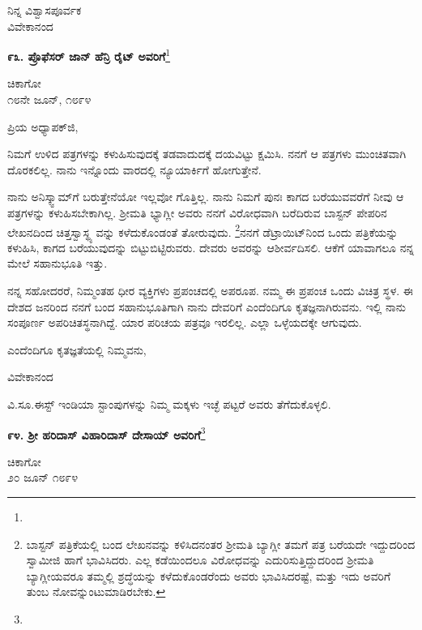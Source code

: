 {\flushright
ನಿನ್ನ ವಿಶ್ವಾಸಪೂರ್ವಕ\\ವಿವೇಕಾನಂದ\par}

\begin{center}
\textbf{೯೩. ಪ್ರೊಫೆಸರ್ ಜಾನ್ ಹೆನ್ರಿ ರೈಟ್ ಅವರಿಗೆ}\footnote{}
\end{center}

\begin{flushright}
ಚಿಕಾಗೋ\\೧೮ನೇ ಜೂನ್, ೧೮೯೪
\end{flushright}

\noindent
ಪ್ರಿಯ ಅಧ್ಯಾಪಕ್‌ಜಿ,

ನಿಮಗೆ ಉಳಿದ ಪತ್ರಗಳನ್ನು ಕಳುಹಿಸುವುದಕ್ಕೆ ತಡವಾದುದಕ್ಕೆ ದಯವಿಟ್ಟು ಕ್ಷಮಿಸಿ. ನನಗೆ ಆ ಪತ್ರಗಳು ಮುಂಚಿತವಾಗಿ ದೊರಕಲಿಲ್ಲ. ನಾನು ಇನ್ನೊಂದು ವಾರದಲ್ಲಿ ನ್ಯೂಯಾರ್ಕಿಗೆ ಹೋಗುತ್ತೇನೆ.

ನಾನು ಅನಿಸ್ಕ್ವಾಮ್‌ಗೆ ಬರುತ್ತೇನೆಯೋ ಇಲ್ಲವೋ ಗೊತ್ತಿಲ್ಲ. ನಾನು ನಿಮಗೆ ಪುನಃ ಕಾಗದ ಬರೆಯುವವರೆಗೆ ನೀವು ಆ ಪತ್ರಗಳನ್ನು ಕಳುಹಿಸಬೇಕಾಗಿಲ್ಲ. ಶ‍್ರೀಮತಿ ಭ್ಯಾಗ್ಲೀ ಅವರು ನನಗೆ ವಿರೋಧವಾಗಿ ಬರೆದಿರುವ ಬಾಸ್ಟನ್ ಪೇಪರಿನ ಲೇಖನದಿಂದ ಚಿತ್ತಸ್ವಾಸ್ಥ್ಯ ವನ್ನು ಕಳೆದುಕೊಂಡಂತೆ ತೋರುವುದು. \footnote{ಬಾಸ್ಟನ್ ಪತ್ರಿಕೆಯಲ್ಲಿ ಬಂದ ಲೇಖನವನ್ನು ಕಳಿಸಿದನಂತರ ಶ‍್ರೀಮತಿ ಬ್ಯಾಗ್ಲೀ ತಮಗೆ ಪತ್ರ ಬರೆಯದೇ ಇದ್ದುದರಿಂದ ಸ್ವಾಮೀಜಿ ಹಾಗೆ ಭಾವಿಸಿದರು. ಎಲ್ಲ ಕಡೆಯಿಂದಲೂ ವಿರೋಧವನ್ನು ಎದುರಿಸುತ್ತಿದ್ದುದರಿಂದ ಶ‍್ರೀಮತಿ ಬ್ಯಾಗ್ಲೀಯವರೂ ತಮ್ಮಲ್ಲಿ ಶ್ರದ್ಧೆಯನ್ನು ಕಳೆದುಕೊಂಡರೆಂದು ಅವರು ಭಾವಿಸಿದರಷ್ಟೆ, ಮತ್ತು ಇದು ಅವರಿಗೆ ತುಂಬ ನೋವನ್ನುಂಟುಮಾಡಿರಬೇಕು.}ನನಗೆ ಡೆಟ್ರಾಯಿಟ್‌ನಿಂದ ಒಂದು ಪತ್ರಿಕೆಯನ್ನು ಕಳುಹಿಸಿ, ಕಾಗದ ಬರೆಯುವುದನ್ನು ಬಿಟ್ಟುಬಿಟ್ಟಿರುವರು. ದೇವರು ಅವರನ್ನು ಆಶೀರ್ವದಿಸಲಿ. ಆಕೆಗೆ ಯಾವಾಗಲೂ ನನ್ನ ಮೇಲೆ ಸಹಾನುಭೂತಿ ಇತ್ತು.

ನನ್ನ ಸಹೋದರರೆ, ನಿಮ್ಮಂತಹ ಧೀರ ವ್ಯಕ್ತಿಗಳು ಪ್ರಪಂಚದಲ್ಲಿ ಅಪರೂಪ. ನಮ್ಮ ಈ ಪ್ರಪಂಚ ಒಂದು ವಿಚಿತ್ರ ಸ್ಥಳ. ಈ ದೇಶದ ಜನರಿಂದ ನನಗೆ ಬಂದ ಸಹಾನುಭೂತಿಗಾಗಿ ನಾನು ದೇವರಿಗೆ ಎಂದೆಂದಿಗೂ ಕೃತಜ್ಞನಾಗಿರುವನು. ಇಲ್ಲಿ ನಾನು ಸಂಪೂರ್ಣ ಅಪರಿಚಿತಸ್ಥನಾಗಿದ್ದೆ. ಯಾರ ಪರಿಚಯ ಪತ್ರವೂ ಇರಲಿಲ್ಲ. ಎಲ್ಲಾ ಒಳ್ಳೆಯದಕ್ಕೇ ಆಗುವುದು.

ಎಂದೆಂದಿಗೂ ಕೃತಜ್ಞತೆಯಲ್ಲಿ ನಿಮ್ಮವನು,

\begin{flushright}
ವಿವೇಕಾನಂದ
\end{flushright}

ವಿ.ಸೂ.\enginline{-}ಈಸ್ಟ್ ಇಂಡಿಯಾ ಸ್ಟಾಂಪುಗಳನ್ನು ನಿಮ್ಮ ಮಕ್ಕಳು ಇಚ್ಛೆ ಪಟ್ಟರೆ ಅವರು ತೆಗೆದುಕೊಳ್ಳಲಿ.

\begin{center}
\textbf{೯೪. ಶ‍್ರೀ ಹರಿದಾಸ್ ವಿಹಾರಿದಾಸ್ ದೇಸಾಯ್ ಅವರಿಗೆ}\footnote{}
\end{center}

\begin{flushright}
ಚಿಕಾಗೋ\\೨೦ ಜೂನ್ ೧೮೯೪
\end{flushright}

